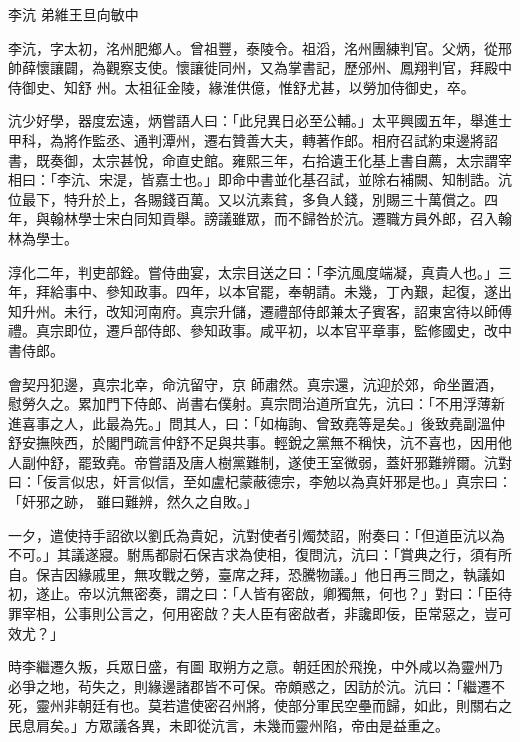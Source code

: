 
\begin{pinyinscope}

 李沆
 弟維王旦向敏中



 李沆，字太初，洺州肥鄉人。曾祖豐，泰陵令。祖滔，洺州團練判官。父炳，從邢帥薛懷讓闢，為觀察支使。懷讓徙同州，又為掌書記，歷邠州、鳳翔判官，拜殿中侍御史、知舒
 州。太祖征金陵，緣淮供億，惟舒尤甚，以勞加侍御史，卒。



 沆少好學，器度宏遠，炳嘗語人曰：「此兒異日必至公輔。」太平興國五年，舉進士甲科，為將作監丞、通判潭州，遷右贊善大夫，轉著作郎。相府召試約束邊將詔書，既奏御，太宗甚悅，命直史館。雍熙三年，右拾遺王化基上書自薦，太宗謂宰相曰：「李沆、宋湜，皆嘉士也。」即命中書並化基召試，並除右補闕、知制誥。沆位最下，特升於上，各賜錢百萬。又以沆素貧，多負人錢，別賜三十萬償之。四
 年，與翰林學士宋白同知貢舉。謗議雖眾，而不歸咎於沆。遷職方員外郎，召入翰林為學士。



 淳化二年，判吏部銓。嘗侍曲宴，太宗目送之曰：「李沆風度端凝，真貴人也。」三年，拜給事中、參知政事。四年，以本官罷，奉朝請。未幾，丁內艱，起復，遂出知升州。未行，改知河南府。真宗升儲，遷禮部侍郎兼太子賓客，詔東宮待以師傅禮。真宗即位，遷戶部侍郎、參知政事。咸平初，以本官平章事，監修國史，改中書侍郎。



 會契丹犯邊，真宗北幸，命沆留守，京
 師肅然。真宗還，沆迎於郊，命坐置酒，慰勞久之。累加門下侍郎、尚書右僕射。真宗問治道所宜先，沆曰：「不用浮薄新進喜事之人，此最為先。」問其人，曰：「如梅詢、曾致堯等是矣。」後致堯副溫仲舒安撫陜西，於閣門疏言仲舒不足與共事。輕銳之黨無不稱快，沆不喜也，因用他人副仲舒，罷致堯。帝嘗語及唐人樹黨難制，遂使王室微弱，蓋奸邪難辨爾。沆對曰：「佞言似忠，奸言似信，至如盧杞蒙蔽德宗，李勉以為真奸邪是也。」真宗曰：「奸邪之跡，
 雖曰難辨，然久之自敗。」



 一夕，遣使持手詔欲以劉氏為貴妃，沆對使者引燭焚詔，附奏曰：「但道臣沆以為不可。」其議遂寢。駙馬都尉石保吉求為使相，復問沆，沆曰：「賞典之行，須有所自。保吉因緣戚里，無攻戰之勞，臺席之拜，恐騰物議。」他日再三問之，執議如初，遂止。帝以沆無密奏，謂之曰：「人皆有密啟，卿獨無，何也？」對曰：「臣待罪宰相，公事則公言之，何用密啟？夫人臣有密啟者，非讒即佞，臣常惡之，豈可效尤？」



 時李繼遷久叛，兵眾日盛，有圖
 取朔方之意。朝廷困於飛挽，中外咸以為靈州乃必爭之地，茍失之，則緣邊諸郡皆不可保。帝頗惑之，因訪於沆。沆曰：「繼遷不死，靈州非朝廷有也。莫若遣使密召州將，使部分軍民空壘而歸，如此，則關右之民息肩矣。」方眾議各異，未即從沆言，未幾而靈州陷，帝由是益重之。




\end{pinyinscope}
